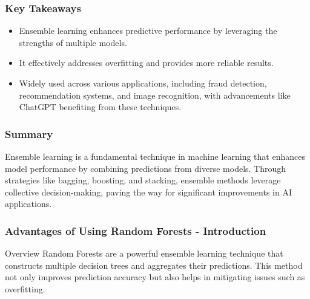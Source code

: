 \documentclass[aspectratio=169]{beamer}
\begin{document}
\begin{frame}[fragile]
    \frametitle{Key Takeaways}
    \begin{itemize}
        \item Ensemble learning enhances predictive performance by leveraging the strengths of multiple models.
        \item It effectively addresses overfitting and provides more reliable results.
        \item Widely used across various applications, including fraud detection, recommendation systems, and image recognition, with advancements like ChatGPT benefiting from these techniques.
    \end{itemize}
\end{frame}

\begin{frame}[fragile]
    \frametitle{Summary}
    Ensemble learning is a fundamental technique in machine learning that enhances model performance by combining predictions from diverse models. Through strategies like bagging, boosting, and stacking, ensemble methods leverage collective decision-making, paving the way for significant improvements in AI applications.
\end{frame}

\begin{frame}[fragile]
    \frametitle{Advantages of Using Random Forests - Introduction}
    \begin{block}{Overview}
        Random Forests are a powerful ensemble learning technique that constructs multiple decision trees and aggregates their predictions. This method not only improves prediction accuracy but also helps in mitigating issues such as overfitting.
    \end{block}
\end{frame}
\end{document}
